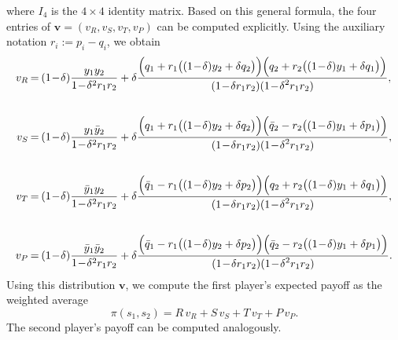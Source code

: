 \documentclass[11pt]{article}
\def\strategy{s}
\theoremstyle{plainCl1}
\theoremstyle{plainCl2}
\begin{document}
where $I_4$ is the $4\times4$ identity matrix. 
Based on this general formula, the four entries of $\mathbf{v}=(v_R, v_S, v_T, v_P)$ can be computed explicitly. 
Using the auxiliary notation $r_i:=p_i\!-\!q_i$, we obtain
    \begin{equation} \label{Eq:vAverage}
      \setlength{\arraycolsep}{1pt}
      \begin{array}{rcl}    
      v_{R} &= &\displaystyle (1\!-\!\delta)\frac{y_1y_2}{1\!-\!\delta^2 r_1 r_2}+\delta \frac{\Big(q_1+r_1\big((1\!-\!\delta)y_2+\delta q_2\big)\Big) \Big(q_2+r_2\big((1\!-\!\delta)y_1+\delta q_1\big)\Big)}
      {\displaystyle(1\!-\!\delta r_1r_2)(1\!-\!\delta^2 r_1 r_2)},\\[1cm]
      v_{S}&= &\displaystyle (1\!-\!\delta)\frac{y_1\bar{y}_2}{1\!-\!\delta^2 r_1 r_2}+\delta \frac{\Big(q_1+r_1\big((1\!-\!\delta)y_2+\delta q_2\big)\Big) \Big(\bar{q}_2-r_2\big((1\!-\!\delta)y_1+\delta p_1\big)\Big)}
      {\displaystyle(1\!-\!\delta r_1r_2)(1\!-\!\delta^2 r_1 r_2)},\\[1cm]
      v_{T} &= &\displaystyle (1\!-\!\delta)\frac{\bar{y}_1y_2}{1\!-\!\delta^2 r_1 r_2}+\delta \frac{\Big(\bar{q}_1-r_1\big((1\!-\!\delta)y_2+\delta p_2\big)\Big) \Big(q_2+r_2\big((1\!-\!\delta)y_1+\delta q_1\big)\Big)}
      {\displaystyle(1\!-\!\delta r_1r_2)(1\!-\!\delta^2 r_1 r_2)},\\[1cm]
      v_{P} &= &\displaystyle (1\!-\!\delta)\frac{\bar{y}_1\bar{y}_2}{1\!-\!\delta^2 r_1 r_2}+\delta \frac{\Big(\bar{q}_1-r_1\big((1\!-\!\delta)y_2+\delta p_2\big)\Big) \Big(\bar{q}_2-r_2\big((1\!-\!\delta)y_1+\delta p_1\big)\Big)}
      {\displaystyle(1\!-\!\delta r_1r_2)(1\!-\!\delta^2 r_1 r_2)}.
      \end{array}
    \end{equation}
Using this distribution $\mathbf{v}$, we compute the first player's expected payoff as the weighted average
\begin{equation}\label{eq:expected_payoff}
\pi(\strategy_1,\strategy_2) = R \, v_R + S\,v_S + T\,v_T + P\,v_P. 
\end{equation}
The second player's payoff can be computed analogously. 

\end{document}
